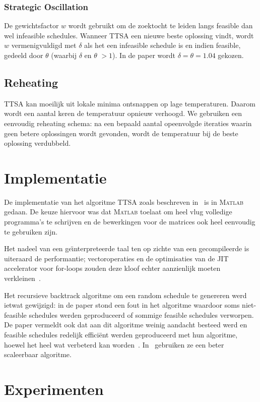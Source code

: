 \documentclass[a4paper,dutch,11pt,]{scrartcl}
\begin{document}
\subsubsection*{Strategic Oscillation}
De gewichtsfactor $w$ wordt gebruikt om de zoektocht te leiden langs feasible dan wel infeasible schedules. Wanneer TTSA een nieuwe beste oplossing vindt, wordt $w$ vermenigvuldigd met $\delta$ als het een infeasible schedule is en indien feasible, gedeeld door $\theta$ (waarbij $\delta$ en $\theta$ $>1$). In de paper wordt $\delta{}=\theta{}=1.04$ gekozen.


\subsection*{Reheating}
TTSA kan moeilijk uit lokale minima ontsnappen op lage temperaturen. Daarom wordt een aantal keren de temperatuur opnieuw verhoogd.
We gebruiken een eenvoudig reheating schema: na een bepaald aantal opeenvolgde iteraties waarin geen betere oplossingen wordt gevonden, wordt 
de temperatuur bij de beste oplossing verdubbeld.


\section{Implementatie}
De implementatie van het algoritme TTSA zoals beschreven in~\cite{paper} is in \textsc{Matlab} gedaan. De keuze hiervoor was dat \textsc{Matlab} toelaat om heel vlug volledige programma's te schrijven en de bewerkingen voor de matrices ook heel eenvoudig te gebruiken zijn.

Het nadeel van een ge\"{\i}nterpreteerde taal ten op zichte van een gecompileerde is uiteraard de performantie; vectoroperaties en de optimisaties van de JIT accelerator voor for-loops zouden deze kloof echter aanzienlijk moeten verkleinen~\cite{matlab}.

Het recursieve backtrack algoritme om een random schedule te genereren werd ietwat gewijzigd: in de paper stond een fout in het algoritme waardoor soms niet-feasible schedules werden geproduceerd of sommige feasible schedules verworpen. De paper vermeldt ook dat aan dit algoritme weinig aandacht besteed werd en feasible schedules redelijk effici\"ent werden geproduceerd met hun algoritme, hoewel het heel wat verbeterd kan worden~\cite{paper}. In~\cite{paper2} gebruiken ze een beter scaleerbaar algoritme.


\section{Experimenten}

\end{document}
